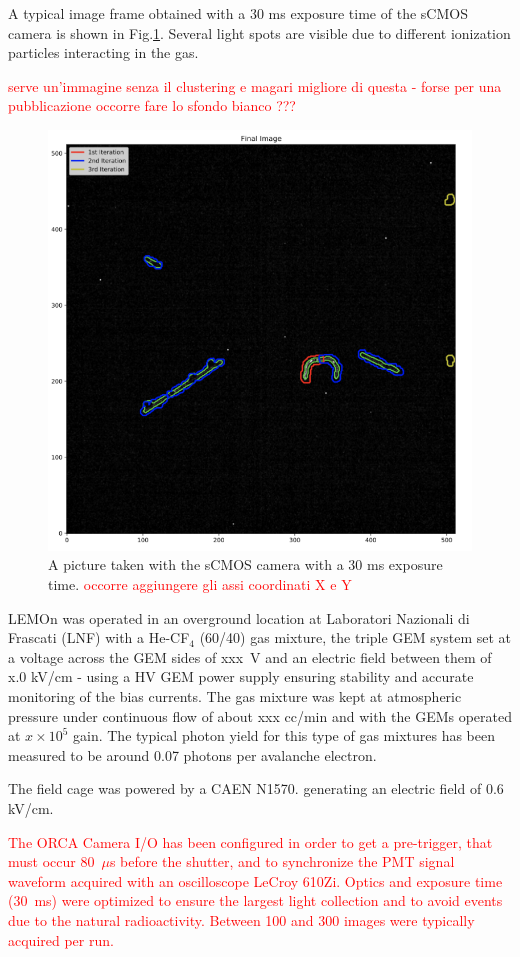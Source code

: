 \documentclass[12pt]{iopart}
\begin{document}
A typical image frame obtained with a 30 ms exposure time of the sCMOS camera is shown in Fig.\ref{fig:typicalimage}. Several light spots are visible due to different ionization particles interacting in the gas.

\textcolor{red}{serve un'immagine senza il clustering e magari migliore di questa - forse per una pubblicazione occorre fare lo sfondo bianco ???}

 
\begin{figure}[ht]
	\centering
	\includegraphics[width=0.45\linewidth]{typicalimage.png}
  	\caption{A picture taken with the sCMOS camera with a 30 ms exposure time. \textcolor{red}{ occorre aggiungere gli assi coordinati X e Y }}
  	\label{fig:typicalimage}
\end{figure}

LEMOn was operated in an overground location at Laboratori Nazionali di Frascati (LNF) with  a He-CF$_4$ (60/40) gas mixture, the triple GEM system set at a voltage across the GEM sides of xxx~V and an electric field between them of x.0 kV/cm - using a HV GEM power supply \cite{Corradi:2007df} ensuring stability and accurate monitoring of the bias currents. The gas mixture was kept at atmospheric pressure under continuous flow of about xxx cc/min and with the GEMs operated at $ x\times10^5$ gain. The typical photon yield for this  type of gas mixtures has been measured to be around  0.07 photons per avalanche electron.\cite{bib:jinst_orange1, bib:roby, bib:tesinatalia}

The field cage was powered by a CAEN N1570.\cite{CAENN1570} generating an electric field  of 0.6 kV/cm. 


\textcolor{red}{The ORCA Camera I/O has been configured in order to get a pre-trigger, that must occur 80~$\mu$s before the shutter, and to synchronize the PMT signal waveform acquired with an oscilloscope LeCroy 610Zi. Optics and exposure time (30~ms) were optimized to ensure the largest light collection and to avoid events due to the natural radioactivity. Between 100 and 300 images were typically acquired per run. }
\end{document}
